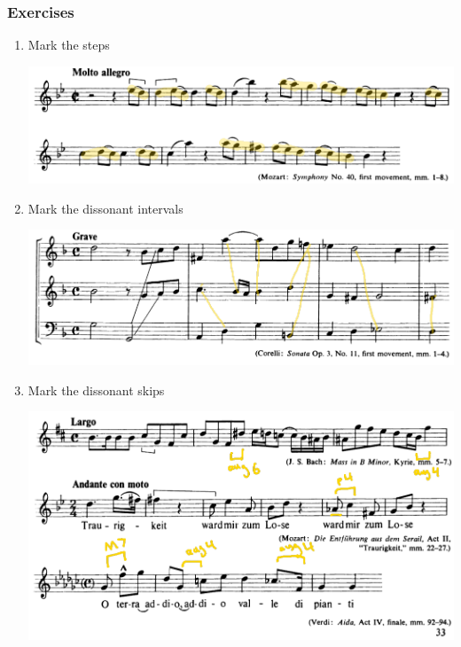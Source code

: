 \documentclass{article}
\begin{document}
\subsubsection{Exercises}
\begin{enumerate}
  \item Mark the steps
    
    \includegraphics[width=\linewidth]{ex31.png}
  \item Mark the dissonant intervals

    \includegraphics[width=\linewidth]{ex32.png}
  \item Mark the dissonant skips

    \includegraphics[width=\linewidth]{ex33.png}
\end{enumerate}
\end{document}
